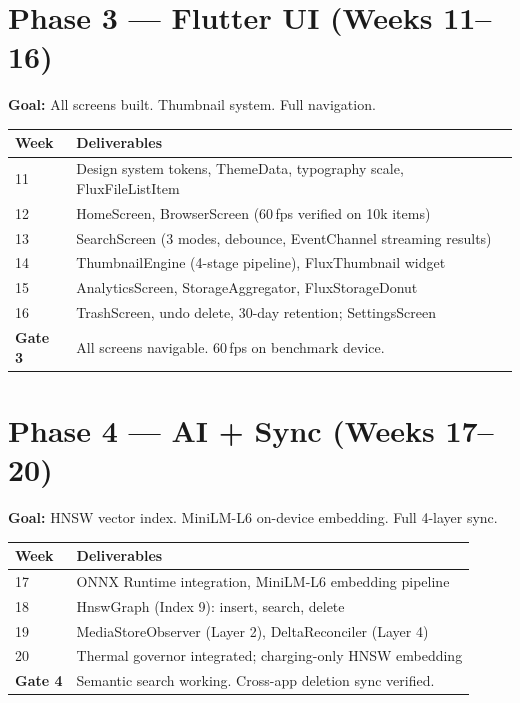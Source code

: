 \section{Phase 3 --- Flutter UI (Weeks 11--16)}

\textbf{Goal:} All screens built. Thumbnail system. Full navigation.

\begin{longtable}{@{}p{14mm}p{126mm}@{}}
\toprule
\textbf{Week} & \textbf{Deliverables} \\
\midrule
11 & Design system tokens, ThemeData, typography scale, FluxFileListItem \\
12 & HomeScreen, BrowserScreen (60\,fps verified on 10k items) \\
13 & SearchScreen (3 modes, debounce, EventChannel streaming results) \\
14 & ThumbnailEngine (4-stage pipeline), FluxThumbnail widget \\
15 & AnalyticsScreen, StorageAggregator, FluxStorageDonut \\
16 & TrashScreen, undo delete, 30-day retention; SettingsScreen \\
\midrule
\textbf{Gate 3} & All screens navigable. 60\,fps on benchmark device. \\
\bottomrule
\end{longtable}

\section{Phase 4 --- AI + Sync (Weeks 17--20)}

\textbf{Goal:} HNSW vector index. MiniLM-L6 on-device embedding. Full 4-layer sync.

\begin{longtable}{@{}p{14mm}p{126mm}@{}}
\toprule
\textbf{Week} & \textbf{Deliverables} \\
\midrule
17 & ONNX Runtime integration, MiniLM-L6 embedding pipeline \\
18 & HnswGraph (Index 9): insert, search, delete \\
19 & MediaStoreObserver (Layer 2), DeltaReconciler (Layer 4) \\
20 & Thermal governor integrated; charging-only HNSW embedding \\
\midrule
\textbf{Gate 4} & Semantic search working. Cross-app deletion sync verified. \\
\bottomrule
\end{longtable}

